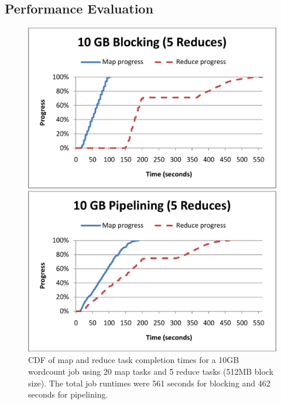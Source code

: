 \subsection{Performance Evaluation}
\label{ch:hop:sec:perf}

\begin{figure}[t]
\ssp
\begin{minipage}{0.5\linewidth}
  \centering
        \includegraphics[width=0.90\linewidth]{figures/wc_10gb_20m5r_blocking}
\end{minipage}
\begin{minipage}{0.5\linewidth}
  \centering
        \includegraphics[width=0.90\linewidth]{figures/wc_10gb_20m5r_pipeline}
\end{minipage}
\caption{CDF of map and reduce task completion times for a 10GB wordcount job
  using 20 map tasks and 5 reduce tasks (512MB block size). The total job
  runtimes were 561 seconds for blocking and 462 seconds for pipelining.}
\label{fig:wc1}
\end{figure}

